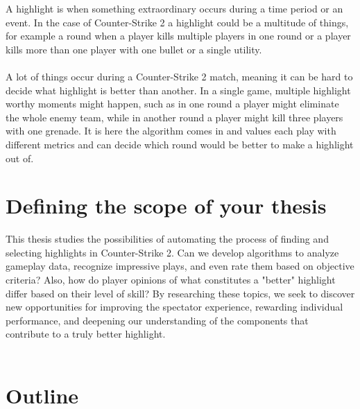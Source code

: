A highlight is when something extraordinary occurs during a time period or an event. In the case of Counter-Strike 2 a highlight could be a multitude of things, for example a round when a player kills multiple players in one round or a player kills more than one player with one bullet or a single utility. \\\\
A lot of things occur during a Counter-Strike 2 match, meaning it can be hard to decide what highlight is better than another. In a single game, multiple highlight worthy moments might happen, such as in one round a player might eliminate the whole enemy team, while in another round a player might kill three players with one grenade. It is here the algorithm comes in and values each play with different metrics and can decide which round would be better to make a highlight out of.


\section{Defining the scope of your thesis}
This thesis studies the possibilities of automating the process of finding and selecting highlights in Counter-Strike 2.  Can we develop algorithms to analyze gameplay data, recognize impressive plays, and even rate them based on objective criteria?  Also, how do player opinions of what constitutes a "better" highlight differ based on their level of skill?  By researching these topics, we seek to discover new opportunities for improving the spectator experience, rewarding individual performance, and deepening our understanding of the components that contribute to a truly better highlight. 
\\\\
\section{Outline}
